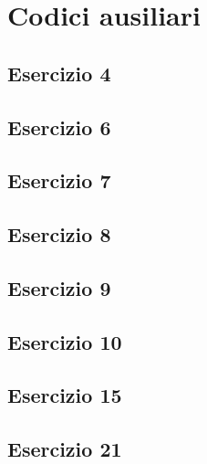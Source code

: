 \section{Codici ausiliari}

\subsection{Esercizio 4}


\subsection{Esercizio 6}


\subsection{Esercizio 7}


\subsection{Esercizio 8}


\subsection{Esercizio 9}


\subsection{Esercizio 10}


\subsection{Esercizio 15}


\subsection{Esercizio 21}


